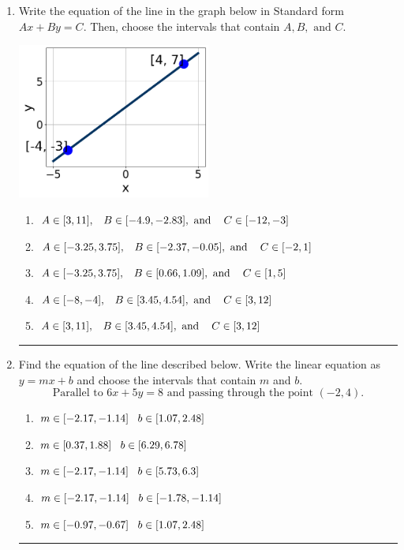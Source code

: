 \documentclass[14pt]{extbook}
\newcommand{\litem}[1]{\item#1\hspace*{-1cm}\rule{\textwidth}{0.4pt}}
\begin{document}
\begin{enumerate}
\litem{
Write the equation of the line in the graph below in Standard form $Ax+By=C$. Then, choose the intervals that contain $A, B, \text{ and } C$.
\begin{center}
    \includegraphics[width=0.5\textwidth]{../Figures/linearGraphToStandardC.png}
\end{center}
\begin{enumerate}[label=\Alph*.]
\item \( A \in [3, 11], \hspace{3mm} B \in [-4.9, -2.83], \text{ and } \hspace{3mm} C \in [-12, -3] \)
\item \( A \in [-3.25, 3.75], \hspace{3mm} B \in [-2.37, -0.05], \text{ and } \hspace{3mm} C \in [-2, 1] \)
\item \( A \in [-3.25, 3.75], \hspace{3mm} B \in [0.66, 1.09], \text{ and } \hspace{3mm} C \in [1, 5] \)
\item \( A \in [-8, -4], \hspace{3mm} B \in [3.45, 4.54], \text{ and } \hspace{3mm} C \in [3, 12] \)
\item \( A \in [3, 11], \hspace{3mm} B \in [3.45, 4.54], \text{ and } \hspace{3mm} C \in [3, 12] \)

\end{enumerate} }
\litem{
Find the equation of the line described below. Write the linear equation as $ y=mx+b $ and choose the intervals that contain $m$ and $b$.\[ \text{Parallel to } 6 x + 5 y = 8 \text{ and passing through the point } (-2, 4). \]\begin{enumerate}[label=\Alph*.]
\item \( m \in [-2.17, -1.14] \hspace*{3mm} b \in [1.07, 2.48] \)
\item \( m \in [0.37, 1.88] \hspace*{3mm} b \in [6.29, 6.78] \)
\item \( m \in [-2.17, -1.14] \hspace*{3mm} b \in [5.73, 6.3] \)
\item \( m \in [-2.17, -1.14] \hspace*{3mm} b \in [-1.78, -1.14] \)
\item \( m \in [-0.97, -0.67] \hspace*{3mm} b \in [1.07, 2.48] \)


\end{enumerate}}
\end{enumerate}
\end{document}
